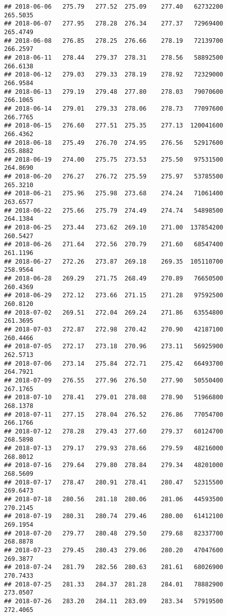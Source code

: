 \documentclass[
]{article}
\begin{document}
\begin{verbatim}
## 2018-06-06   275.79   277.52  275.09    277.40   62732200     265.5035
## 2018-06-07   277.95   278.28  276.34    277.37   72969400     265.4749
## 2018-06-08   276.85   278.25  276.66    278.19   72139700     266.2597
## 2018-06-11   278.44   279.37  278.31    278.56   58892500     266.6138
## 2018-06-12   279.03   279.33  278.19    278.92   72329000     266.9584
## 2018-06-13   279.19   279.48  277.80    278.03   79070600     266.1065
## 2018-06-14   279.01   279.33  278.06    278.73   77097600     266.7765
## 2018-06-15   276.60   277.51  275.35    277.13  120041600     266.4362
## 2018-06-18   275.49   276.70  274.95    276.56   52917600     265.8882
## 2018-06-19   274.00   275.75  273.53    275.50   97531500     264.8690
## 2018-06-20   276.27   276.72  275.59    275.97   53785500     265.3210
## 2018-06-21   275.96   275.98  273.68    274.24   71061400     263.6577
## 2018-06-22   275.66   275.79  274.49    274.74   54898500     264.1384
## 2018-06-25   273.44   273.62  269.10    271.00  137854200     260.5427
## 2018-06-26   271.64   272.56  270.79    271.60   68547400     261.1196
## 2018-06-27   272.26   273.87  269.18    269.35  105110700     258.9564
## 2018-06-28   269.29   271.75  268.49    270.89   76650500     260.4369
## 2018-06-29   272.12   273.66  271.15    271.28   97592500     260.8120
## 2018-07-02   269.51   272.04  269.24    271.86   63554800     261.3695
## 2018-07-03   272.87   272.98  270.42    270.90   42187100     260.4466
## 2018-07-05   272.17   273.18  270.96    273.11   56925900     262.5713
## 2018-07-06   273.14   275.84  272.71    275.42   66493700     264.7921
## 2018-07-09   276.55   277.96  276.50    277.90   50550400     267.1765
## 2018-07-10   278.41   279.01  278.08    278.90   51966800     268.1378
## 2018-07-11   277.15   278.04  276.52    276.86   77054700     266.1766
## 2018-07-12   278.28   279.43  277.60    279.37   60124700     268.5898
## 2018-07-13   279.17   279.93  278.66    279.59   48216000     268.8012
## 2018-07-16   279.64   279.80  278.84    279.34   48201000     268.5609
## 2018-07-17   278.47   280.91  278.41    280.47   52315500     269.6473
## 2018-07-18   280.56   281.18  280.06    281.06   44593500     270.2145
## 2018-07-19   280.31   280.74  279.46    280.00   61412100     269.1954
## 2018-07-20   279.77   280.48  279.50    279.68   82337700     268.8878
## 2018-07-23   279.45   280.43  279.06    280.20   47047600     269.3877
## 2018-07-24   281.79   282.56  280.63    281.61   68026900     270.7433
## 2018-07-25   281.33   284.37  281.28    284.01   78882900     273.0507
## 2018-07-26   283.20   284.11  283.09    283.34   57919500     272.4065

\end{verbatim}
\end{document}
